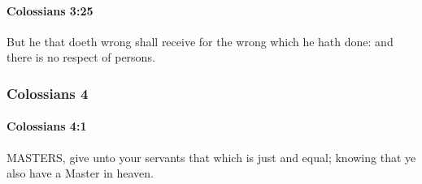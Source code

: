 		\paragraph{Colossians 3:25} %
			\label{COLOSSIANS-3-25}

			But he that doeth wrong shall receive for the wrong which he hath done: and there is no respect of persons.

			\begin{framed}
			\scriptsize
				\begin{compactdesc}
					\item[SBLG] 
				\end{compactdesc}
			\end{framed}

	\subsubsection{Colossians 4} %
		\label{COLOSSIANS-4}
		
		\paragraph{Colossians 4:1} %
			\label{COLOSSIANS-4-1}

			MASTERS, give unto your servants that which is just and equal; knowing that ye also have a Master in heaven.

